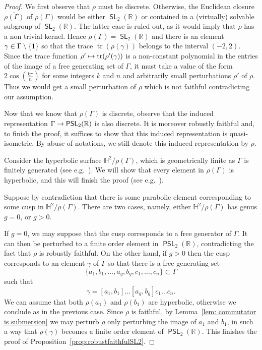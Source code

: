 \documentclass[AHL,Unicode,longabstracts]{cedram}
\DeclareMathOperator{\SL}{\mathsf{SL}}
\DeclareMathOperator{\PSL}{\mathsf{PSL}}
\DeclareMathOperator{\tr}{tr}
\newcommand{\R}{\mathbb{R}}
\newcommand{\HH}{\mathbb{H}}
\renewcommand*{\to}{\mathchoice{\longrightarrow}{\rightarrow}{\rightarrow}{\rightarrow}}
\let\oldmapsto\mapsto
\renewcommand*{\mapsto}{\mathchoice{\longmapsto}{\oldmapsto}{\oldmapsto}{\oldmapsto}}
\let\oldin\in
\renewcommand{\in}{\mathchoice{\oldin}{\oldin}{\,\oldin\,}{\,\oldin\,}}
\begin{document}
\begin{proof}
We first observe that $\rho$ must be discrete.
Otherwise, the Euclidean closure $\overline{\rho(\Gamma)}$ of $\rho(\Gamma)$ would be either $\SL_2(\R)$ or contained in a (virtually) solvable subgroup of $\SL_2(\R)$. The latter case is ruled out, as it would imply that $\rho$ has a non trivial kernel. Hence $\overline{\rho(\Gamma)} = \SL_2(\R)$ and there is an element $\gamma\in\Gamma\setminus\{1\}$ so that the trace $\tr(\rho(\gamma))$ belongs to the interval $(-2,2)$. Since the trace function $\rho' \mapsto \tr(\rho'(\gamma))$ is a non-constant polynomial in the entries of the image of a free generating set of $\Gamma$, it must take a value of the form 
$2 \cos(\frac{k \pi}{n})$ for some integers $k$ and $n$ and arbitrarily small perturbations $\rho'$ of $\rho$. Thus we would get a small perturbation of $\rho$ which is not faithful contradicting our assumption.

Now that we know that $\rho(\Gamma)$ is discrete, observe that the induced representation $\Gamma\to\PSL_2(\R)$ is also discrete. It is moreover robustly faithful and, to finish the proof, it suffices to show that this induced representation is quasi-isometric. By abuse of notations, we still denote this induced representation by $\rho$.

Consider the hyperbolic surface $\HH^2/\rho(\Gamma)$, which is geometrically finite as $\Gamma$ is finitely generated (see e.g.~\cite[Theorem~4.6.1]{skatok}). We will show that every element in $\rho(\Gamma)$ is hyperbolic, and this will finish the proof (see e.g.~\cite[Theorems~4.8 \& 4.13 and Corollary~4.17]{dalbogeodesichorocyclic}).



Suppose by contradiction that there is some parabolic element corresponding to some cusp in $\HH^2/\rho(\Gamma)$. There are two cases, namely, either $\HH^2/\rho(\Gamma)$ has genus $g=0$, or $g>0$.

If $g=0$, we may suppose that the cusp corresponds to a free generator of $\Gamma$.
It can then be perturbed to a finite order element in $\PSL_2(\R)$, contradicting the fact that $\rho$ is robustly faithful. On the other hand, if $g>0$ then the cusp corresponds to an element $\gamma$ of $\Gamma$ so that there is a free generating set
\[
\{a_1,b_1,\dots,a_g,b_g,c_1,\dots,c_n\}\subset\Gamma
\]
such that
\[
\gamma=[a_1,b_1]\dots[a_g,b_g]c_1\dots c_n.
\]
We can assume that both $\rho(a_1)$ and $\rho(b_1)$ are hyperbolic, otherwise we conclude as in the previous case. Since $\rho$ is faithful, by Lemma~\ref{lem: commutator is submersion} we may perturb $\rho$ only perturbing the image of $a_1$ and $b_1$, in such a way that $\rho(\gamma)$ becomes a finite order element of $\PSL_2(\R)$. This finishes the proof of Proposition~\ref{prop:robustfaithfulSL2}.
\end{proof}
\end{document}
